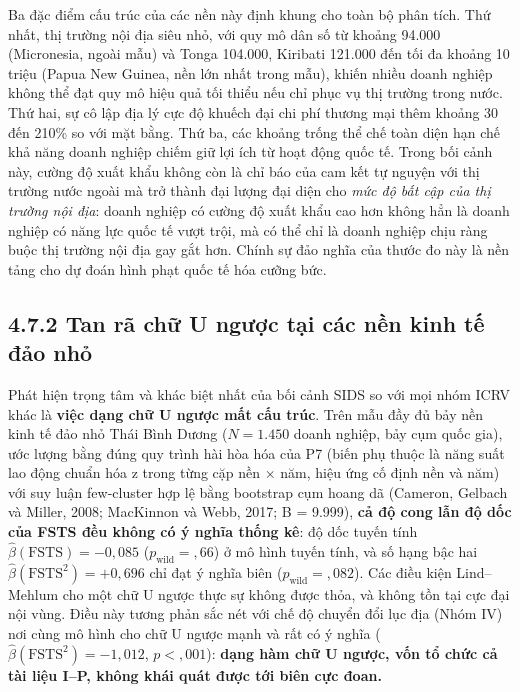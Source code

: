 \documentclass[
  a4paper,
  13pt]{extreport}
\begin{document}
Ba đặc điểm cấu trúc của các nền này định khung cho toàn bộ phân tích.
Thứ nhất, thị trường nội địa siêu nhỏ, với quy mô dân số từ khoảng
94.000 (Micronesia, ngoài mẫu) và Tonga 104.000, Kiribati 121.000 đến
tối đa khoảng 10 triệu (Papua New Guinea, nền lớn nhất trong mẫu), khiến
nhiều doanh nghiệp không thể đạt quy mô hiệu quả tối thiểu nếu chỉ phục
vụ thị trường trong nước. Thứ hai, sự cô lập địa lý cực độ khuếch đại
chi phí thương mại thêm khoảng 30 đến 210\% so với mặt bằng. Thứ ba, các
khoảng trống thể chế toàn diện hạn chế khả năng doanh nghiệp chiếm giữ
lợi ích từ hoạt động quốc tế. Trong bối cảnh này, cường độ xuất khẩu
không còn là chỉ báo của cam kết tự nguyện với thị trường nước ngoài mà
trở thành đại lượng đại diện cho \emph{mức độ bất cập của thị trường nội
địa}: doanh nghiệp có cường độ xuất khẩu cao hơn không hẳn là doanh
nghiệp có năng lực quốc tế vượt trội, mà có thể chỉ là doanh nghiệp chịu
ràng buộc thị trường nội địa gay gắt hơn. Chính sự đảo nghĩa của thước
đo này là nền tảng cho dự đoán hình phạt quốc tế hóa cưỡng bức.

\hypertarget{tan-ruxe3-chux1eef-u-ngux1b0ux1ee3c-tux1ea1i-cuxe1c-nux1ec1n-kinh-tux1ebf-ux111ux1ea3o-nhux1ecf}{%
\subsection{4.7.2 Tan rã chữ U ngược tại các nền kinh tế đảo
nhỏ}\label{tan-ruxe3-chux1eef-u-ngux1b0ux1ee3c-tux1ea1i-cuxe1c-nux1ec1n-kinh-tux1ebf-ux111ux1ea3o-nhux1ecf}}

Phát hiện trọng tâm và khác biệt nhất của bối cảnh SIDS so với mọi nhóm
ICRV khác là \textbf{việc dạng chữ U ngược mất cấu trúc}. Trên mẫu đầy
đủ bảy nền kinh tế đảo nhỏ Thái Bình Dương (\(N = 1.450\) doanh nghiệp,
bảy cụm quốc gia), ước lượng bằng đúng quy trình hài hòa hóa của P7
(biến phụ thuộc là năng suất lao động chuẩn hóa z trong từng cặp nền ×
năm, hiệu ứng cố định nền và năm) với suy luận few-cluster hợp lệ bằng
bootstrap cụm hoang dã (Cameron, Gelbach và Miller, 2008; MacKinnon và
Webb, 2017; B = 9.999), \textbf{cả độ cong lẫn độ dốc của FSTS đều không
có ý nghĩa thống kê}: độ dốc tuyến tính
\(\hat{\beta}(\text{FSTS}) = -0{,}085\) (\(p_{\text{wild}} = {,}66\)) ở
mô hình tuyến tính, và số hạng bậc hai
\(\hat{\beta}(\text{FSTS}^2) = +0{,}696\) chỉ đạt ý nghĩa biên
(\(p_{\text{wild}} = {,}082\)). Các điều kiện Lind--Mehlum cho một chữ U
ngược thực sự không được thỏa, và không tồn tại cực đại nội vùng. Điều
này tương phản sắc nét với chế độ chuyển đổi lục địa (Nhóm IV) nơi cùng
mô hình cho chữ U ngược mạnh và rất có ý nghĩa
(\(\hat{\beta}(\text{FSTS}^2) = -1{,}012\), \(p < {,}001\)):
\textbf{dạng hàm chữ U ngược, vốn tổ chức cả tài liệu I--P, không khái
quát được tới biên cực đoan.}
\end{document}
